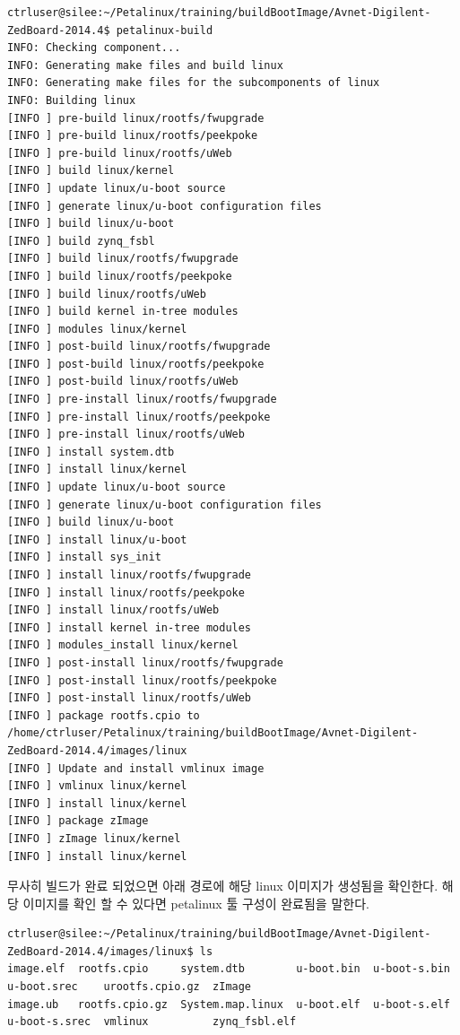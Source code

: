 \documentclass[11pt
  , a4paper
  , article
  , oneside
]{memoir}
\begin{document}
\begin{lstlisting}[style=termstyle]
ctrluser@silee:~/Petalinux/training/buildBootImage/Avnet-Digilent-ZedBoard-2014.4$ petalinux-build 
INFO: Checking component...
INFO: Generating make files and build linux
INFO: Generating make files for the subcomponents of linux
INFO: Building linux
[INFO ] pre-build linux/rootfs/fwupgrade
[INFO ] pre-build linux/rootfs/peekpoke
[INFO ] pre-build linux/rootfs/uWeb
[INFO ] build linux/kernel
[INFO ] update linux/u-boot source
[INFO ] generate linux/u-boot configuration files
[INFO ] build linux/u-boot
[INFO ] build zynq_fsbl
[INFO ] build linux/rootfs/fwupgrade
[INFO ] build linux/rootfs/peekpoke
[INFO ] build linux/rootfs/uWeb
[INFO ] build kernel in-tree modules
[INFO ] modules linux/kernel
[INFO ] post-build linux/rootfs/fwupgrade
[INFO ] post-build linux/rootfs/peekpoke
[INFO ] post-build linux/rootfs/uWeb
[INFO ] pre-install linux/rootfs/fwupgrade
[INFO ] pre-install linux/rootfs/peekpoke
[INFO ] pre-install linux/rootfs/uWeb
[INFO ] install system.dtb
[INFO ] install linux/kernel
[INFO ] update linux/u-boot source
[INFO ] generate linux/u-boot configuration files
[INFO ] build linux/u-boot
[INFO ] install linux/u-boot
[INFO ] install sys_init
[INFO ] install linux/rootfs/fwupgrade
[INFO ] install linux/rootfs/peekpoke
[INFO ] install linux/rootfs/uWeb
[INFO ] install kernel in-tree modules
[INFO ] modules_install linux/kernel
[INFO ] post-install linux/rootfs/fwupgrade
[INFO ] post-install linux/rootfs/peekpoke
[INFO ] post-install linux/rootfs/uWeb
[INFO ] package rootfs.cpio to /home/ctrluser/Petalinux/training/buildBootImage/Avnet-Digilent-ZedBoard-2014.4/images/linux
[INFO ] Update and install vmlinux image
[INFO ] vmlinux linux/kernel
[INFO ] install linux/kernel
[INFO ] package zImage
[INFO ] zImage linux/kernel
[INFO ] install linux/kernel
\end{lstlisting}

무사히 빌드가 완료 되었으면 아래 경로에 해당 linux 이미지가 생성됨을 확인한다. 해당 이미지를 확인 할 수 있다면 petalinux 툴 구성이 완료됨을 말한다.

\begin{lstlisting}[style=termstyle]
ctrluser@silee:~/Petalinux/training/buildBootImage/Avnet-Digilent-ZedBoard-2014.4/images/linux$ ls
image.elf  rootfs.cpio     system.dtb        u-boot.bin  u-boot-s.bin  u-boot.srec    urootfs.cpio.gz  zImage
image.ub   rootfs.cpio.gz  System.map.linux  u-boot.elf  u-boot-s.elf  u-boot-s.srec  vmlinux          zynq_fsbl.elf
\end{lstlisting}
\end{document}
